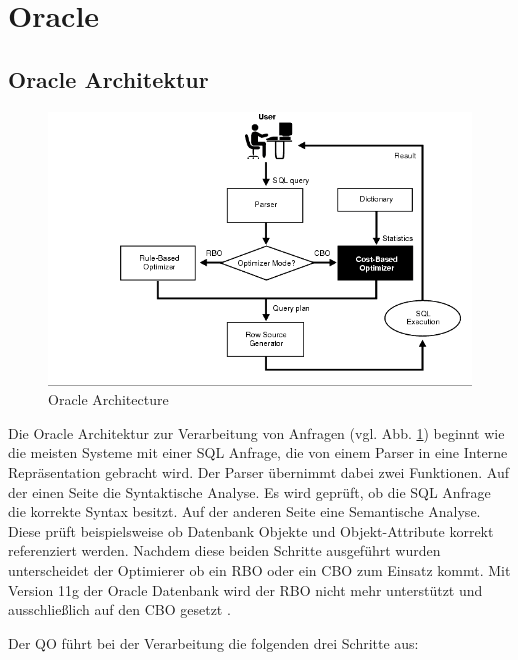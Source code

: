 \section{Oracle}
\subsection{Oracle Architektur}


\begin{figure}[h]
  \centering
  \includegraphics[width=\textwidth]{03_Related_Work/OracleArchitecture.png}
  \caption{Oracle Architecture \cite{Oracle2004Basics}}
  \label{OracleArchitecture}
\end{figure}



Die Oracle Architektur zur Verarbeitung von Anfragen \cite{Oracle2004Basics} (vgl. Abb. \ref{OracleArchitecture})  beginnt wie die meisten Systeme mit einer SQL Anfrage, die von einem Parser in eine Interne Repräsentation gebracht wird. Der Parser übernimmt dabei zwei Funktionen. Auf der einen Seite die Syntaktische Analyse. Es wird geprüft, ob die SQL Anfrage die korrekte Syntax besitzt. Auf der anderen Seite eine Semantische Analyse. Diese prüft beispielsweise ob Datenbank Objekte und Objekt-Attribute  korrekt referenziert werden. Nachdem diese beiden Schritte ausgeführt wurden unterscheidet der Optimierer ob ein \ac{RBO} oder ein \ac{CBO} zum Einsatz kommt. Mit Version 11g der Oracle Datenbank wird der \ac{RBO} nicht mehr unterstützt und ausschließlich auf den \ac{CBO} gesetzt \cite{dba_oracle2015}.

Der \ac{QO} führt bei der Verarbeitung die folgenden drei Schritte aus:

